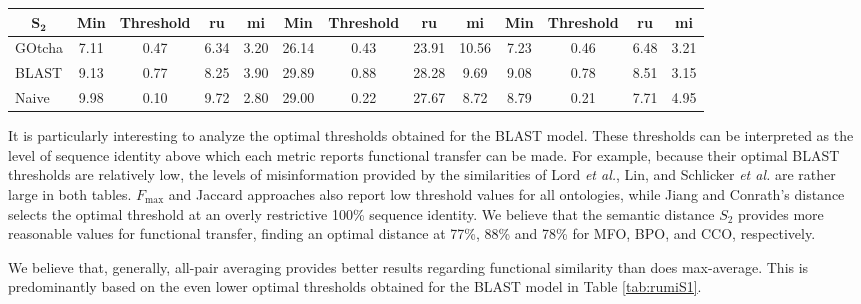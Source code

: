 \begin{table}[t]
{\begin{tabular}{c|cccc|cccc|cccc}
$\mathbf{S_{2}}$  & Min & Threshold & ru & mi & Min & Threshold & ru & mi & Min & Threshold & ru & mi\\
\hline
\multicolumn{1}{l|}{GOtcha}& 7.11 & 0.47 & 6.34 & 3.20 & 26.14 & 0.43 & 23.91 & 10.56 & 7.23 & 0.46 & 6.48 & 3.21 \\
\multicolumn{1}{l|}{BLAST}& 9.13 & 0.77 & 8.25 & 3.90 & 29.89 & 0.88 & 28.28 & 9.69 & 9.08 & 0.78 & 8.51 & 3.15 \\
\multicolumn{1}{l|}{Naive}& 9.98 & 0.10 & 9.72 & 2.80 & 29.00 & 0.22 & 27.67 & 8.72 & 8.79 & 0.21 & 7.71 & 4.95 \\

\end{tabular}}{}
\end{table}




It is particularly interesting to analyze the optimal thresholds obtained for the BLAST model. These thresholds can be interpreted as the level of sequence identity above which each metric reports  functional transfer can be made. For example, because their optimal BLAST thresholds are relatively low, the levels of misinformation provided by the similarities of Lord \emph{et al.}, Lin, and Schlicker \emph{et al.} are rather large in both tables. $F_{\max}$ and Jaccard approaches also report low threshold values for all ontologies, while Jiang and Conrath's distance selects the optimal threshold at an overly restrictive 100\% sequence identity. We believe that the semantic distance $S_2$ provides more reasonable values for functional transfer, finding an optimal distance at 77\%, 88\% and 78\% for MFO, BPO, and CCO, respectively.

We believe that, generally, all-pair averaging provides better results regarding functional similarity than does max-average.  This is predominantly based on the even lower optimal thresholds obtained for the BLAST model in Table \ref{tab:rumiS1}.

